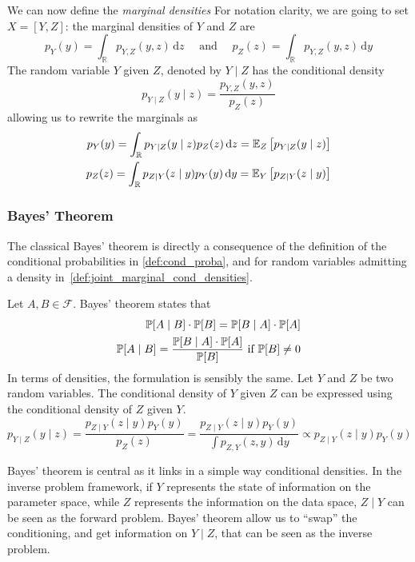 \documentclass[../../Main_ManuscritThese.tex]{subfiles}
\begin{document}
\begin{definition}
  We can now define the \emph{marginal densities}
  For notation clarity, we are going to set $X = [Y,Z]$: the marginal densities of $Y$ and $Z$ are
  \begin{equation}
    \label{eq:marginals_def}
    p_{Y}(y) = \int_{\mathbb{R}}p_{Y,Z}(y,z) \,\mathrm{d}z \quad \text{ and } \quad p_{Z}(z) = \int_{\mathbb{R}}p_{Y,Z}(y,z) \,\mathrm{d}y
  \end{equation}
  The random variable $Y$ given $Z$, denoted by $Y \mid Z$ has the conditional density
  \begin{equation}
    p_{Y \mid Z}(y \mid z) = \frac{p_{Y,Z}(y,z)}{p_Z(z)}
  \end{equation}
  allowing us to rewrite the marginals as
  \begin{align}
    \label{eq:marginal_conditioned}
        p_{Y}(y) = \int_{\mathbb{R}}p_{Y\mid Z}(y\mid z)p_Z(z) \,\mathrm{d}z=\mathbb{E}_Z\left[p_{Y\mid Z}(y\mid z)\right] \\ p_{Z}(z) = \int_{\mathbb{R}}p_{Z\mid Y}(z\mid y)p_Y(y) \,\mathrm{d}y = \mathbb{E}_{Y}\left[p_{Z\mid Y}(z\mid y)\right]
  \end{align}

\end{definition}

\subsubsection{Bayes' Theorem}
\label{ssec:bayes_theorem}

The classical Bayes' theorem is directly a consequence of the definition of the conditional probabilities in \cref{def:cond_proba}, and for random variables admitting a density in~\cref{def:joint_marginal_cond_densities}.

\begin{theorem}
  Let $A, B\in\mathcal{F}$. Bayes' theorem states that
  \begin{align*}
    \mathbb{P}[A\mid B]\cdot \mathbb{P}[B] = \mathbb{P}[B \mid A]\cdot\mathbb{P}[A] \\
    \mathbb{P}[A \mid B] = \frac{\mathbb{P}[B \mid A]\cdot\mathbb{P}[A]}{\mathbb{P}[B]} \text{ if } \mathbb{P}[B] \neq 0
  \end{align*}
 In terms of densities, the formulation is sensibly the same.
  Let $Y$ and $Z$ be two random variables. The conditional density of $Y$ given $Z$ can be expressed using the conditional density of $Z$ given $Y$.
  \begin{equation}
    p_{Y\mid Z}(y \mid z) = \frac{p_{Z\mid Y}(z\mid y) p_Y(y)}{p_Z(z)} = \frac{p_{Z\mid Y}(z\mid y) p_Y(y)}{\int p_{Z,Y}(z,y) \,\mathrm{d}y}  \propto p_{Z\mid Y}(z\mid y) p_Y(y)
  \end{equation}
\end{theorem}
Bayes' theorem is central as it links in a simple way conditional densities. In the inverse problem framework, if $Y$ represents the state of information on the parameter space, while $Z$ represents the information on the data space, $Z\mid Y$ can be seen as the forward problem. Bayes' theorem allow us to ``swap'' the conditioning, and get information on $Y\mid Z$, that can be seen as the inverse problem.
\end{document}
